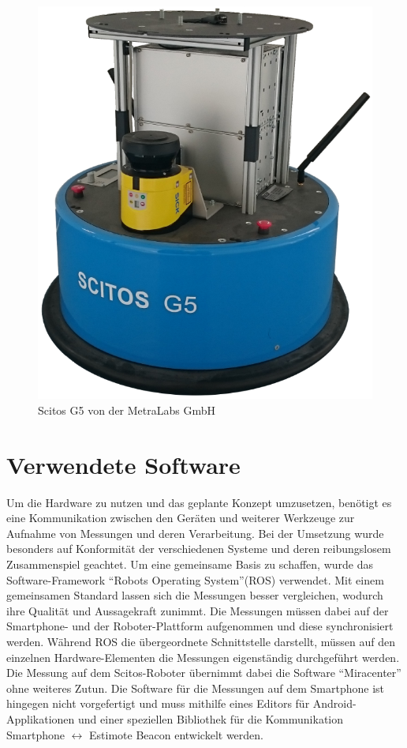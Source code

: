 \begin{figure}[H] 
\centering
\includegraphics[scale=0.2]{Bilder/Scitos}
\caption{Scitos G5 von der MetraLabs GmbH}
\label{fig:Scitos}
\end{figure}
\section{Verwendete Software}
Um die Hardware zu nutzen und das geplante Konzept umzusetzen, benötigt es eine Kommunikation zwischen den Geräten und weiterer Werkzeuge zur Aufnahme von Messungen und deren Verarbeitung. Bei der Umsetzung wurde besonders auf Konformität der verschiedenen Systeme und deren reibungslosem Zusammenspiel geachtet. Um eine gemeinsame Basis zu schaffen, wurde das Software-Framework "`Robots Operating System"'(ROS) verwendet. Mit einem gemeinsamen Standard lassen sich die Messungen besser vergleichen, wodurch ihre Qualität und Aussagekraft zunimmt. Die Messungen müssen dabei auf der Smartphone- und der Roboter-Plattform aufgenommen und diese synchronisiert werden. Während ROS die übergeordnete Schnittstelle darstellt, müssen auf den einzelnen Hardware-Elementen die Messungen eigenständig durchgeführt werden. Die Messung auf dem Scitos-Roboter übernimmt dabei die Software "`Miracenter"' ohne weiteres Zutun. Die Software für die Messungen auf dem Smartphone ist hingegen nicht vorgefertigt und muss mithilfe eines Editors für Android-Applikationen und einer speziellen Bibliothek für die Kommunikation Smartphone $\leftrightarrow$ Estimote Beacon entwickelt werden.
